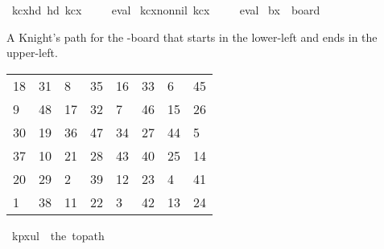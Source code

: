 \begin{isabellebody}
\endisatagproof
{\isafoldproof}%
%
\isadelimproof
\isanewline
%
\endisadelimproof
\isanewline
{}\isamarkupfalse%
\ kc{\isacharunderscore}{\kern0pt}{}x{}{\isacharunderscore}{\kern0pt}hd{\isacharcolon}{\kern0pt}\ {\isachardoublequoteopen}hd\ kc{}x{}\ {\isacharequal}{\kern0pt}\ {\isacharparenleft}{\kern0pt}{}{\isacharcomma}{\kern0pt}{}{\isacharparenright}{\kern0pt}{\isachardoublequoteclose}%
\isadelimproof
\ %
\endisadelimproof
%
\isatagproof
{}\isamarkupfalse%
\ eval%
\endisatagproof
{\isafoldproof}%
%
\isadelimproof
%
\endisadelimproof
\isanewline
\isanewline
{}\isamarkupfalse%
\ kc{\isacharunderscore}{\kern0pt}{}x{}{\isacharunderscore}{\kern0pt}non{\isacharunderscore}{\kern0pt}nil{\isacharcolon}{\kern0pt}\ {\isachardoublequoteopen}kc{}x{}\ {\isasymnoteq}\ {\isacharbrackleft}{\kern0pt}{\isacharbrackright}{\kern0pt}{\isachardoublequoteclose}%
\isadelimproof
\ %
\endisadelimproof
%
\isatagproof
{}\isamarkupfalse%
\ eval%
\endisatagproof
{\isafoldproof}%
%
\isadelimproof
%
\endisadelimproof
\isanewline
\isanewline
{}\isamarkupfalse%
\ {\isachardoublequoteopen}b{}x{}\ {\isasymequiv}\ board\ {}\ {}{\isachardoublequoteclose}%
\begin{isamarkuptext}%
A Knight's path for the -board that starts in the lower-left and ends in the 
upper-left.
  \begin{table}[H]
    \begin{tabular}{llllllll}
      18 & 31 &  8 & 35 & 16 & 33 &  6 & 45 \\
       9 & 48 & 17 & 32 &  7 & 46 & 15 & 26 \\
      30 & 19 & 36 & 47 & 34 & 27 & 44 &  5 \\
      37 & 10 & 21 & 28 & 43 & 40 & 25 & 14 \\
      20 & 29 &  2 & 39 & 12 & 23 &  4 & 41 \\
       1 & 38 & 11 & 22 &  3 & 42 & 13 & 24
    \end{tabular}
  \end{table}%
\end{isamarkuptext}\isamarkuptrue%
\isamarkupfalse%
\ {\isachardoublequoteopen}kp{}x{}ul\ {\isasymequiv}\ the\ {\isacharparenleft}{\kern0pt}to{\isacharunderscore}{\kern0pt}path\ \isanewline

\end{isabellebody}
